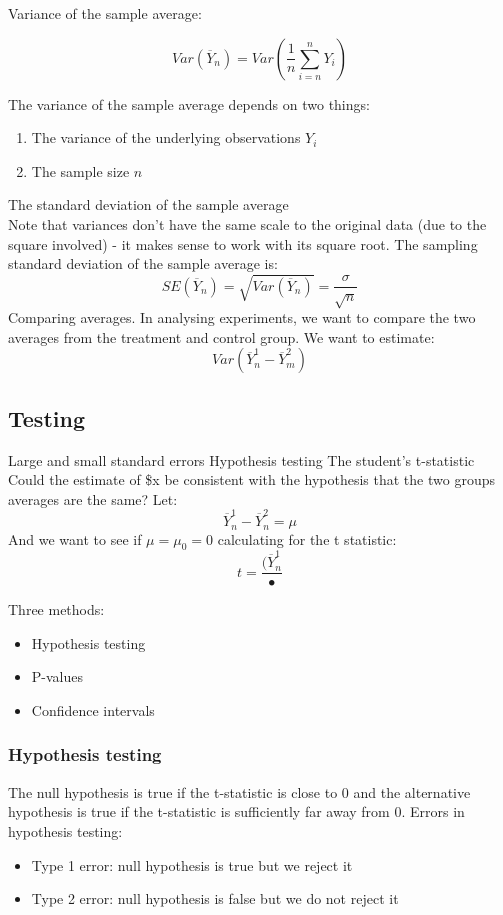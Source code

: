 \documentclass[12pt, letterpaper]{article}
\begin{document}
{Variance of the sample average:
\begin{center}
	$$Var(\overline{Y}_n) = Var( \frac{1}{n	} \sum_{i=n}^{n} Y_i)$$
\end{center}
The variance of the sample average depends on two things:
\begin{enumerate}
	\item The variance of the underlying observations $Y_i$
	\item The sample size $n$
\end{enumerate}
The standard deviation of the sample average\\
Note that variances don't have the same scale to the original data (due to the square involved) - it makes sense to work with its square root. The sampling standard deviation of the sample average is:
$$SE(\overline{Y}_n) = \sqrt{Var(\overline{Y}_n)} = \frac{\sigma}{\sqrt{n}}$$
Comparing averages. In analysing experiments, we want to compare the two averages from the treatment and control group. We want to estimate:
$$Var(\overline{Y}_n^1 - \overline{Y}_m^2)$$

\subsection{Testing}
Large and small standard errors
Hypothesis testing
The student's t-statistic
Could the estimate of \$x be consistent with the hypothesis that the two groups averages are the same? Let:
$$\overline{Y}_n^1 - \overline{Y}_n^2 = \mu$$
And we want to see if $\mu = \mu_0 = 0$ calculating for the t statistic:
$$t=\frac{(\overline{Y}_n^1}{•}$$

Three methods:
\begin{itemize}
	\item Hypothesis testing
	\item P-values
	\item Confidence intervals
\end{itemize}

\subsubsection{Hypothesis testing}
The null hypothesis is true if the t-statistic is close to 0 and the alternative hypothesis is true if the t-statistic is sufficiently far away from 0.
Errors in hypothesis testing:
\begin{itemize}
	\item Type 1 error: null hypothesis is true but we reject it
	\item Type 2 error: null hypothesis is false but we do not reject it
\end{itemize}

}
\end{document}
